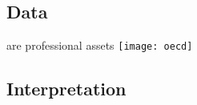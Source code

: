 \documentclass[t]{beamer}
\begin{document}
  \subsection{Data}

  \begin{frame}[t]{ are professional assets}
    \texttt{[image: oecd]}
  \end{frame}


  \subsection{Interpretation}

\end{document}
